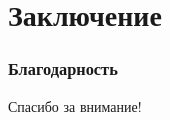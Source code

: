 \section{Заключение}
\begin{frame}
	\frametitle{Благодарность}
	\begin{center}
		Спасибо за внимание!
	\end{center}
\end{frame}
